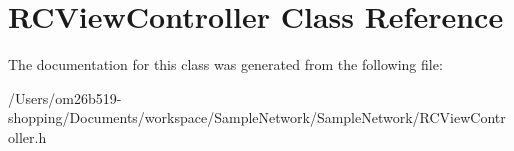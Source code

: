 \hypertarget{interface_r_c_view_controller}{\section{R\-C\-View\-Controller Class Reference}
\label{interface_r_c_view_controller}
}


The documentation for this class was generated from the following file\-:\begin{DoxyCompactItemize}
\item 
/\-Users/om26b519-\/shopping/\-Documents/workspace/\-Sample\-Network/\-Sample\-Network/R\-C\-View\-Controller.\-h\end{DoxyCompactItemize}
